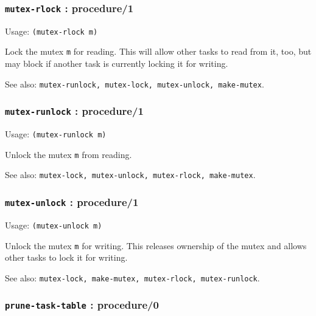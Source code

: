 \documentclass[
]{article}
\newcommand{\passthrough}[1]{#1}
\begin{document}
\hypertarget{mutex-rlock-procedure1}{%
\subsubsection{\texorpdfstring{\texttt{mutex-rlock} :
procedure/1}{mutex-rlock : procedure/1}}\label{mutex-rlock-procedure1}}

Usage: \passthrough{\lstinline!(mutex-rlock m)!}

Lock the mutex \passthrough{\lstinline!m!} for reading. This will allow
other tasks to read from it, too, but may block if another task is
currently locking it for writing.

See also:
\passthrough{\lstinline!mutex-runlock, mutex-lock, mutex-unlock, make-mutex!}.

\hypertarget{mutex-runlock-procedure1}{%
\subsubsection{\texorpdfstring{\texttt{mutex-runlock} :
procedure/1}{mutex-runlock : procedure/1}}\label{mutex-runlock-procedure1}}

Usage: \passthrough{\lstinline!(mutex-runlock m)!}

Unlock the mutex \passthrough{\lstinline!m!} from reading.

See also:
\passthrough{\lstinline!mutex-lock, mutex-unlock, mutex-rlock, make-mutex!}.

\hypertarget{mutex-unlock-procedure1}{%
\subsubsection{\texorpdfstring{\texttt{mutex-unlock} :
procedure/1}{mutex-unlock : procedure/1}}\label{mutex-unlock-procedure1}}

Usage: \passthrough{\lstinline!(mutex-unlock m)!}

Unlock the mutex \passthrough{\lstinline!m!} for writing. This releases
ownership of the mutex and allows other tasks to lock it for writing.

See also:
\passthrough{\lstinline!mutex-lock, make-mutex, mutex-rlock, mutex-runlock!}.

\hypertarget{prune-task-table-procedure0}{%
\subsubsection{\texorpdfstring{\texttt{prune-task-table} :
procedure/0}{prune-task-table : procedure/0}}\label{prune-task-table-procedure0}}
\end{document}
